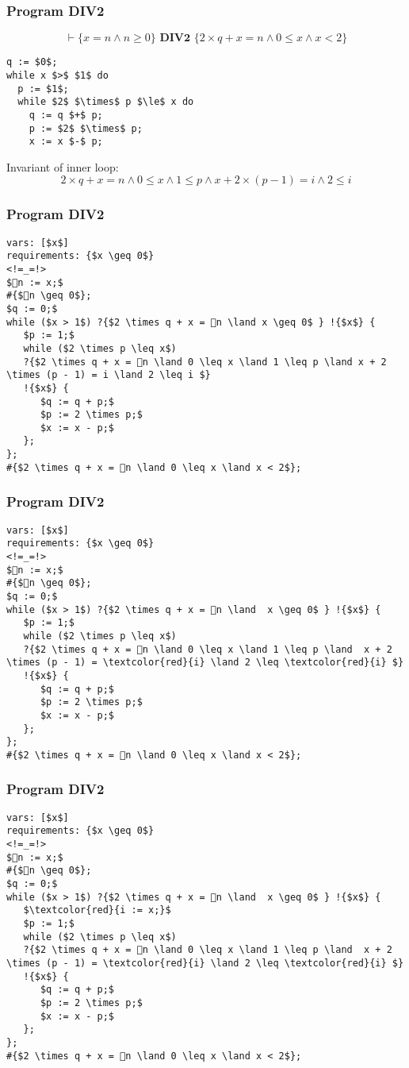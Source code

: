 \begin{frame}[containsverbatim]
  \frametitle{Program DIV2}
  $$\vdash \{x = n \land n \geq 0\} \textbf{ DIV2 } \{ 2 \times q + x = n \land 0 \leq x \land x < 2 \}$$
\begin{lstlisting}[mathescape=true]
q := $0$;
while x $>$ $1$ do
  p := $1$;
  while $2$ $\times$ p $\le$ x do
    q := q $+$ p;
    p := $2$ $\times$ p;
    x := x $-$ p;
\end{lstlisting}
Invariant of inner loop: $$2 \times q + x = n \land 0 \leq x \land 1 \leq p \land x + 2 \times (p - 1) = i \land 2 \leq i$$
\end{frame}

\begin{frame}[containsverbatim]
  \frametitle{Program DIV2}
\begin{lstlisting}[mathescape=true]
vars: [$x$]
requirements: {$x \geq 0$}
<!=_=!>
$👻n := x;$
#{$👻n \geq 0$};
$q := 0;$
while ($x > 1$) ?{$2 \times q + x = 👻n \land x \geq 0$ } !{$x$} {
   $p := 1;$
   while ($2 \times p \leq x$)
   ?{$2 \times q + x = 👻n \land 0 \leq x \land 1 \leq p \land x + 2 \times (p - 1) = i \land 2 \leq i $}
   !{$x$} {
      $q := q + p;$
      $p := 2 \times p;$
      $x := x - p;$
   };
};
#{$2 \times q + x = 👻n \land 0 \leq x \land x < 2$};
\end{lstlisting}
\end{frame}


\begin{frame}[containsverbatim]
  \frametitle{Program DIV2}
\begin{lstlisting}[mathescape=true]
vars: [$x$]
requirements: {$x \geq 0$}
<!=_=!>
$👻n := x;$
#{$👻n \geq 0$};
$q := 0;$
while ($x > 1$) ?{$2 \times q + x = 👻n \land  x \geq 0$ } !{$x$} {
   $p := 1;$
   while ($2 \times p \leq x$)
   ?{$2 \times q + x = 👻n \land 0 \leq x \land 1 \leq p \land  x + 2 \times (p - 1) = \textcolor{red}{i} \land 2 \leq \textcolor{red}{i} $}
   !{$x$} {
      $q := q + p;$
      $p := 2 \times p;$
      $x := x - p;$
   };
};
#{$2 \times q + x = 👻n \land 0 \leq x \land x < 2$};
\end{lstlisting}
\end{frame}

\begin{frame}[containsverbatim]
  \frametitle{Program DIV2}
\begin{lstlisting}[mathescape=true]
vars: [$x$]
requirements: {$x \geq 0$}
<!=_=!>
$👻n := x;$
#{$👻n \geq 0$};
$q := 0;$
while ($x > 1$) ?{$2 \times q + x = 👻n \land  x \geq 0$ } !{$x$} {
   $\textcolor{red}{i := x;}$
   $p := 1;$
   while ($2 \times p \leq x$)
   ?{$2 \times q + x = 👻n \land 0 \leq x \land 1 \leq p \land  x + 2 \times (p - 1) = \textcolor{red}{i} \land 2 \leq \textcolor{red}{i} $}
   !{$x$} {
      $q := q + p;$
      $p := 2 \times p;$
      $x := x - p;$
   };
};
#{$2 \times q + x = 👻n \land 0 \leq x \land x < 2$};
\end{lstlisting}
\end{frame}


